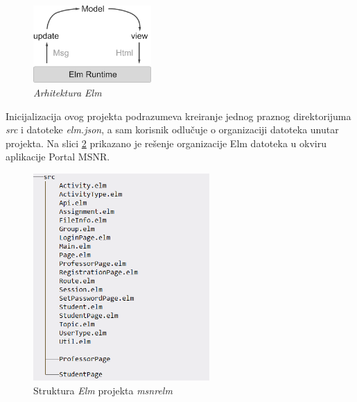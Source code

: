 \documentclass[12pt,oneside]{memoir}
\begin{document}
\begin{figure}[!ht]
  \centering
  \includegraphics[width=0.4\textwidth]{elmprog.png}
  \caption{\emph{Arhitektura Elm} \cite{rad}}
  \label{fig:elm-prog}
\end{figure}


\par Inicijalizacija ovog projekta podrazumeva kreiranje jednog praznog direktorijuma \emph{src} i datoteke \emph{elm.json}, a sam korisnik odlučuje o organizaciji datoteka unutar projekta. Na slici \ref{fig:msnrelm} prikazano je rešenje organizacije Elm datoteka u okviru aplikacije Portal MSNR. 


\begin{figure}[!ht]
  \centering
  \includegraphics[width=0.6\textwidth]{msnr-elm.png}
  \caption{Struktura \emph{Elm} projekta \emph{msnr{\textunderscore}elm} \cite{rad}}
  \label{fig:msnrelm}
\end{figure}
\end{document}
